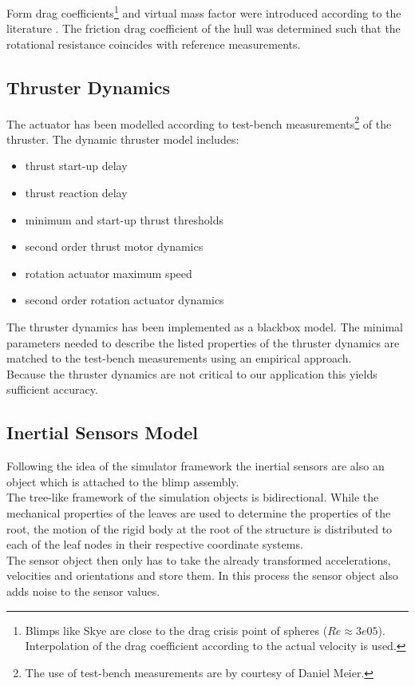Form drag coefficients\footnote{
Blimps like Skye are close to the drag crisis point of spheres ($Re\approx3e05$). Interpolation of the drag coefficient according to the actual velocity is used.}
and virtual mass factor were introduced according to the literature \citep{Kundu2012}.
The friction drag coefficient of the hull was determined such that the rotational resistance coincides with reference measurements.

\subsection{Thruster Dynamics}
\label{sub:thrust_dynamics}
The actuator has been modelled according to test-bench measurements\footnote{The use of test-bench measurements are by courtesy of Daniel Meier.} of the thruster.
The dynamic thruster model includes:
\begin{itemize}
\item thrust start-up delay
\item thrust reaction delay
\item minimum and start-up thrust thresholds
\item second order thrust motor dynamics
\item rotation actuator maximum speed
\item second order rotation actuator dynamics
\end{itemize}
The thruster dynamics has been implemented as a blackbox model.
The minimal parameters needed to describe the listed properties of the thruster dynamics are matched to the test-bench measurements using an empirical approach.  \\
Because the thruster dynamics are not critical to our application this yields sufficient accuracy.

\subsection{Inertial Sensors Model}
\label{sub:imu_model}
Following the idea of the simulator framework the inertial sensors are also an object which is attached to the blimp assembly. \\
The tree-like framework of the simulation objects is bidirectional.
While the mechanical properties of the leaves are used to determine the properties of the root,
the motion of the rigid body at the root of the structure is distributed to each of the leaf nodes in their respective coordinate systems. \\
The sensor object then only has to take the already transformed accelerations, velocities and orientations and store them.
In this process the sensor object also adds noise to the sensor values.

